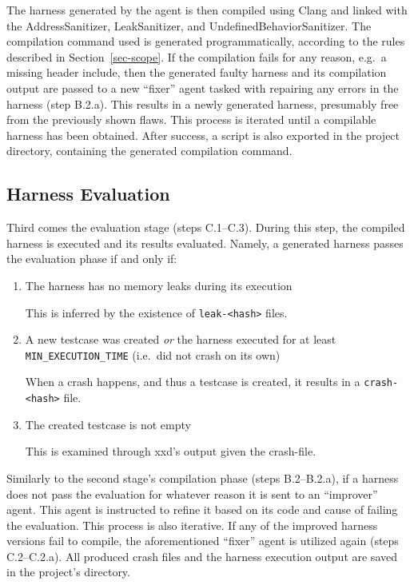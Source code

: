 \documentclass[
  a4paper,
]{scrreprt}
\theoremstyle{definition}
\theoremstyle{remark}
\begin{document}
The harness generated by the agent is then compiled using Clang and
linked with the AddressSanitizer, LeakSanitizer, and
UndefinedBehaviorSanitizer. The compilation command used is generated
programmatically, according to the rules described in
Section~\ref{sec-scope}. If the compilation fails for any reason, e.g.~a
missing header include, then the generated faulty harness and its
compilation output are passed to a new ``fixer'' agent tasked with
repairing any errors in the harness (step B.2.a). This results in a
newly generated harness, presumably free from the previously shown
flaws. This process is iterated until a compilable harness has been
obtained. After success, a script is also exported in the project
directory, containing the generated compilation command.

\subsection{Harness Evaluation}\label{sec-evaluation}

Third comes the evaluation stage (steps C.1--C.3). During this step, the
compiled harness is executed and its results evaluated. Namely, a
generated harness passes the evaluation phase if and only if:

\begin{enumerate}
\def\labelenumi{\arabic{enumi}.}
\item
  The harness has no memory leaks during its execution

  This is inferred by the existence of
  \texttt{leak-\textless{}hash\textgreater{}} files.
\item
  A new testcase was created \emph{or} the harness executed for at least
  \texttt{MIN\_EXECUTION\_TIME} (i.e.~did not crash on its own)

  When a crash happens, and thus a testcase is created, it results in a
  \texttt{crash-\textless{}hash\textgreater{}} file.
\item
  The created testcase is not empty

  This is examined through xxd's output given the crash-file.
\end{enumerate}

Similarly to the second stage's compilation phase (steps B.2--B.2.a), if
a harness does not pass the evaluation for whatever reason it is sent to
an ``improver'' agent. This agent is instructed to refine it based on
its code and cause of failing the evaluation. This process is also
iterative. If any of the improved harness versions fail to compile, the
aforementioned ``fixer'' agent is utilized again (steps C.2--C.2.a). All
produced crash files and the harness execution output are saved in the
project's directory.
\end{document}
